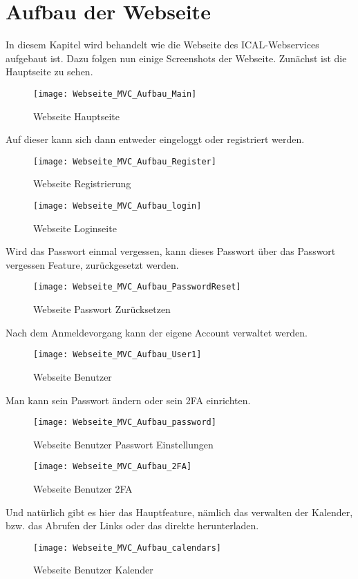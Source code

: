 {\section{Aufbau der Webseite }
\label{sec:aufbau}
In diesem Kapitel wird behandelt wie die Webseite des ICAL-Webservices aufgebaut ist. Dazu folgen nun einige Screenshots der Webseite.
Zunächst ist die Hauptseite zu sehen.\\
\begin{figure}[H]
    \texttt{[image: Webseite\_MVC\_Aufbau\_Main]}
    \caption{Webseite Hauptseite}
    \label{fig:webmainpage}
\end{figure}
Auf dieser kann sich dann entweder eingeloggt oder registriert werden.\\
\begin{figure}[H]
    \texttt{[image: Webseite\_MVC\_Aufbau\_Register]}
    \caption{Webseite Registrierung}
    \label{fig:webregister}
\end{figure}
\begin{figure}[H]
    \texttt{[image: Webseite\_MVC\_Aufbau\_login]}
    \caption{Webseite Loginseite}
    \label{fig:weblogin}
\end{figure}
Wird das Passwort einmal vergessen, kann dieses Passwort über das Passwort vergessen Feature, zurückgesetzt werden. 
\begin{figure}[H]
    \texttt{[image: Webseite\_MVC\_Aufbau\_PasswordReset]}
    \caption{Webseite Passwort Zurücksetzen}
    \label{fig:webpwdforgot}
\end{figure}
Nach dem Anmeldevorgang kann der eigene Account verwaltet werden.\\
\begin{figure}[H]
    \texttt{[image: Webseite\_MVC\_Aufbau\_User1]}
    \caption{Webseite Benutzer}
    \label{fig:webuser}
\end{figure}
Man kann sein Passwort ändern oder sein 2FA einrichten. \\
\begin{figure}[H]
    \texttt{[image: Webseite\_MVC\_Aufbau\_password]}
    \caption{Webseite Benutzer Passwort Einstellungen}
    \label{fig:webuserpwd}
\end{figure}
\begin{figure}[H]
    \texttt{[image: Webseite\_MVC\_Aufbau\_2FA]}
    \caption{Webseite Benutzer 2FA}
    \label{fig:webuser2fa}
\end{figure}
Und natürlich gibt es hier das Hauptfeature, nämlich das verwalten der Kalender, bzw. das Abrufen der Links oder das direkte herunterladen.\\
\begin{figure}[H]
    \texttt{[image: Webseite\_MVC\_Aufbau\_calendars]}
    \caption{Webseite Benutzer Kalender}
    \label{fig:webusercal}
\end{figure}
}
